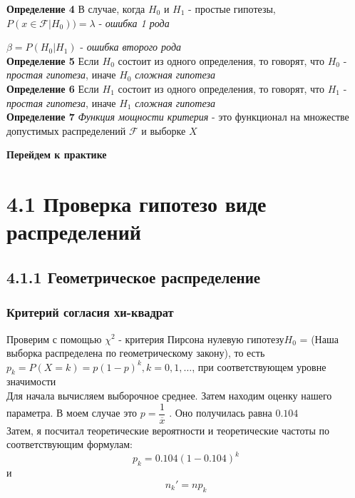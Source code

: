 \documentclass[a4paper,12pt, oneside]{book}
\begin{document}
\normalsize{\textbf{Определение 4}} В случае, когда $ H_0 $ и $ H_1 $ - простые гипотезы, $ P(x \in \mathcal{F} | H_0)) = \lambda $ - {\it ошибка 1 рода}

$ \beta = P(H_0 | H_1) $ - \textit{ошибка второго рода}\\

\normalsize{\textbf{Определение 5}} Если $ H_0 $ состоит из одного определения, то говорят, что $ H_0 $ - \textit{простая гипотеза}, иначе $ H_0 $  \textit{сложная гипотеза}\\

\normalsize{\textbf{Определение 6}} Если $ H_1 $ состоит из одного определения, то говорят, что $ H_1 $ - \textit{простая гипотеза}, иначе $ H_1 $  \textit{сложная гипотеза}\\

\normalsize{\textbf{Определение 7}} \textit{ Функция мощности критерия } - это функционал на множестве допустимых распределений  $ \mathcal{F} $  и выборке $ X $

\newpage
\begin{center}
	\textbf{\Large Перейдем к практике}
\end{center}

\chapter{4.1 Проверка гипотезо виде распределений}

\section{4.1.1 Геометрическое распределение}

\subsection{Критерий согласия хи-квадрат}


Проверим с помощью $ \chi^2 $  - критерия Пирсона нулевую гипотезу$ H_0 $ = (Наша выборка распределена по геометрическому закону), то есть $ p_k = P(X = k ) = p (1-p)^k, k = 0,1, \ldots $, при соответствующем уровне значимости\\ 


Для начала вычисляем выборочное среднее. Затем находим оценку нашего параметра. В моем случае это $ p = \dfrac{1}{\overline{x}} $ . Оно получилась равна $ 0.104 $\\

Затем, я посчитал теоретические вероятности и теоретические частоты по соответствующим  формулам:\\
$$ 
p_k = 0.104 (1 - 0.104)^k 
$$
и
$$
n_k' = n p_k
$$  
\end{document}
